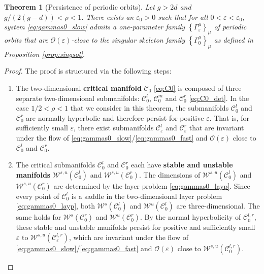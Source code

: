 \documentclass[a4paper,10pt,abstract=true,parskip=true]{scrartcl}
\newtheorem{thm}{Theorem}
\theoremstyle{remark}
\numberwithin{equation}{section}
\numberwithin{thm}{section}
\newcommand{\eps}{\varepsilon}
\begin{document}
\begin{thm}[Persistence of periodic orbits]\label{thm:po_existence}
    Let $g>2d$ and $g/(2(g-d)) < \rho < 1$. There exists an $\eps_0>0$ such that for all $0<\eps<\eps_0$, system \eqref{eq:gammas0_slow} admits a one-parameter family $\left\{\Gamma_\eps^\mu\right\}_\mu$ of periodic orbits that are $\mathcal{O}(\eps)$-close to the singular skeleton family $\left\{\Gamma_0^\mu\right\}_\mu$ as defined in Proposition \ref{prop:singsol}.
\end{thm}

\begin{proof}
The proof is structured via the following steps:
\begin{enumerate}
    \item The two-dimensional \textbf{critical manifold} $\mathcal{C}_0$ \eqref{eq:C0} is composed of three separate two-dimen\-sional submanifolds: $\mathcal{C}_0^l$, $\mathcal{C}_0^m$ and $\mathcal{C}_0^r$ \eqref{eq:C0_det}. In the case $1/2<\rho<1$ that we consider in this theorem, the submanifolds $\mathcal{C}_0^l$ and $\mathcal{C}_0^r$ are normally hyperbolic and therefore persist for positive $\eps$. That is, for sufficiently small $\eps$, there exist submanifolds $\mathcal{C}_\eps^l$ and $\mathcal{C}_\eps^r$ that are invariant under the flow of \eqref{eq:gammas0_slow}/\eqref{eq:gammas0_fast} and $\mathcal{O}(\eps)$ close to $\mathcal{C}_0^l$ and $\mathcal{C}_0^r$.
    \item The critical submanifolds $\mathcal{C}_0^l$ and $\mathcal{C}_0^r$ each have \textbf{stable and unstable manifolds} $\mathcal{W}^{s,u}(\mathcal{C}_0^l)$ and $\mathcal{W}^{s,u}(\mathcal{C}_0^r)$. The dimensions of $\mathcal{W}^{s,u}(\mathcal{C}_0^l)$ and $\mathcal{W}^{s,u}(\mathcal{C}_0^r)$ are determined by the layer problem \eqref{eq:gammas0_layp}. Since every point of $\mathcal{C}_0^l$ is a saddle in the two-dimensional layer problem \eqref{eq:gammas0_layp}, both $\mathcal{W}^{s}(\mathcal{C}_0^l)$ and $\mathcal{W}^{u}(\mathcal{C}_0^l)$ are three-dimensional. The same holds for $\mathcal{W}^{s}(\mathcal{C}_0^r)$ and $\mathcal{W}^{u}(\mathcal{C}_0^r)$. By the normal hyperbolicity of $\mathcal{C}_0^{l,r}$, these stable and unstable manifolds persist for positive and sufficiently small $\eps$ to $\mathcal{W}^{s,u}(\mathcal{C}_\eps^{l,r})$, which are invariant under the flow of \eqref{eq:gammas0_slow}/\eqref{eq:gammas0_fast} and $\mathcal{O}(\eps)$ close to $\mathcal{W}^{s,u}(\mathcal{C}_0^{l,r})$.

\end{enumerate}
\end{proof}
\end{document}
